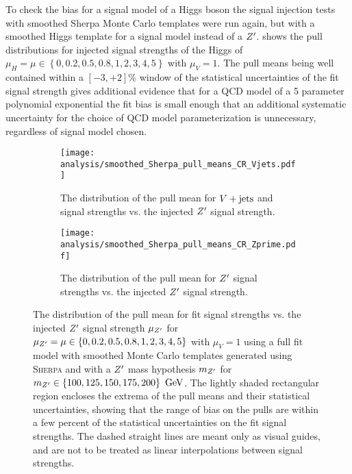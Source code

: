 To check the bias for a signal model of a Higgs boson the signal injection tests with smoothed Sherpa Monte Carlo templates were run again, but with a smoothed Higgs template for a signal model instead of a $\Zprime$.
 shows the pull distributions for injected signal strengths of the Higgs of $\mu_{H} = \mu \in \left\{0, 0.2, 0.5, 0.8, 1, 2, 3, 4, 5\right\}$ with $\mu_{V} = 1$.
The pull means being well contained within a $\left[-3,+2\right]\%$ window of the statistical uncertainties of the fit signal strength gives additional evidence that for a QCD model of a 5 parameter polynomial exponential the fit bias is small enough that an additional systematic uncertainty for the choice of QCD model parameterization is unnecessary, regardless of signal model chosen.

\begin{figure}[htbp]
 \centering
 \begin{subfigure}[t]{0.48\textwidth}
  \centering
  \texttt{[image: analysis/smoothed\_Sherpa\_pull\_means\_CR\_Vjets.pdf]}
  \caption[The distribution of the pull mean for $\Vjets$ and signal strengths vs. the injected $\Zprime$ signal strength.]{%
   The distribution of the pull mean for $\Vjets$ and signal strengths vs. the injected $\Zprime$ signal strength.}
  \label{fig:pulls_Vjets_Sherpa}
 \end{subfigure}%
 \quad
 \begin{subfigure}[t]{0.48\textwidth}
  \centering
  \texttt{[image: analysis/smoothed\_Sherpa\_pull\_means\_CR\_Zprime.pdf]}
  \caption[The distribution of the pull mean for $\Zprime$ signal strengths vs. the injected $\Zprime$ signal strength.]{%
   The distribution of the pull mean for $\Zprime$ signal strengths vs. the injected $\Zprime$ signal strength.}
  \label{fig:pulls_Zprime_Sherpa}
 \end{subfigure}
 \caption[The distribution of the pull mean for fit signal strengths vs. the injected $\Zprime$ signal strength with \textsc{Sherpa} Monte Carlo templates.]{%
  The distribution of the pull mean for fit signal strengths vs. the injected $\Zprime$ signal strength $\mu_{Z'}$ for $\mu_{Z'} = \mu \in \left\{0, 0.2, 0.5, 0.8, 1, 2, 3, 4, 5\right\}$ with $\mu_{V} = 1$ using a full fit model with smoothed Monte Carlo templates generated using \textsc{Sherpa} and with a $\Zprime$ mass hypothesis $m_{Z'}$ for
  $m_{Z'} \in \left\{100, 125, 150, 175, 200\right\}~\mathrm{GeV}$.
  The lightly shaded rectangular region encloses the extrema of the pull means and their statistical uncertainties, showing that the range of bias on the pulls are within a few percent of the statistical uncertainties on the fit signal strengths.
  The dashed straight lines are meant only as visual guides, and are not to be treated as linear interpolations between signal strengths.}
 \label{fig:pulls_summary_smoothed_Sherpa}
\end{figure}

